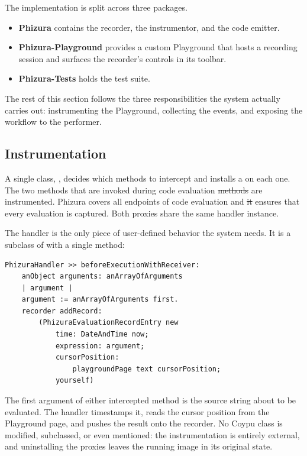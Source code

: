 \documentclass[
]{ceurart}
\providecommand{\DIFdel}[1]{{\protect\color{red}\sout{#1}}} %
\providecommand{\DIFdelbegin}{} %
\providecommand{\DIFdelend}{} %
\newcommand{\DIFscaledelfig}{0.5}
\newlength{\DIFdelgraphicswidth} %
\newlength{\DIFdelgraphicsheight} %
\newcommand{\DIFdelincludegraphics}[2][]{%
\sbox{\DIFdelgraphicsbox}{\DIFOincludegraphics[#1]{#2}}%
\settoboxwidth{\DIFdelgraphicswidth}{\DIFdelgraphicsbox} %
\settoboxtotalheight{\DIFdelgraphicsheight}{\DIFdelgraphicsbox} %
\scalebox{\DIFscaledelfig}{%
\parbox[b]{\DIFdelgraphicswidth}{\usebox{\DIFdelgraphicsbox}\\[-\baselineskip] \rule{\DIFdelgraphicswidth}{0em}}\llap{\resizebox{\DIFdelgraphicswidth}{\DIFdelgraphicsheight}{%
\setlength{\unitlength}{\DIFdelgraphicswidth}%
\begin{picture}(1,1)%
\thicklines\linethickness{2pt} %
{\color[rgb]{1,0,0}\put(0,0){\framebox(1,1){}}}%
{\color[rgb]{1,0,0}\put(0,0){\line( 1,1){1}}}%
{\color[rgb]{1,0,0}\put(0,1){\line(1,-1){1}}}%
\end{picture}%
}\hspace*{3pt}}} %
} %
\DeclareRobustCommand{\DIFdelbegin}{\DIFOdelbegin \let\includegraphics\DIFdelincludegraphics} %
\DeclareRobustCommand{\DIFdelend}{\DIFOaddend \let\includegraphics\DIFOincludegraphics} %
\begin{document}
The implementation is split across three packages.

\begin{itemize}
\item \textbf{Phizura} contains the recorder, the instrumentor, and the code emitter.
\item \textbf{Phizura-Playground} provides a custom Playground that hosts a recording session and surfaces the recorder's controls in its toolbar.
\item \textbf{Phizura-Tests} holds the test suite.
\end{itemize}

The rest of this section follows the three responsibilities the system actually carries out: instrumenting the Playground, collecting the events, and exposing the workflow to the performer.

\subsection{Instrumentation}

A single class, , decides which methods to intercept and installs a  on each one.
The two methods that are invoked during code evaluation \DIFdelbegin \DIFdel{methods }\DIFdelend are instrumented.
Phizura covers all endpoints of code evaluation and \DIFdelbegin \DIFdel{it }\DIFdelend ensures that every evaluation is captured.
Both proxies share the same handler instance.

The handler is the only piece of user-defined behavior the system needs.
It is a subclass of  with a single method:

\begin{lstlisting}[label={lst:handler-before},caption={PhizuraHandler before-execution hook}]
PhizuraHandler >> beforeExecutionWithReceiver:
    anObject arguments: anArrayOfArguments
    | argument |
    argument := anArrayOfArguments first.
    recorder addRecord:
        (PhizuraEvaluationRecordEntry new
            time: DateAndTime now;
            expression: argument;
            cursorPosition:
                playgroundPage text cursorPosition;
            yourself)
\end{lstlisting}

The first argument of either intercepted method is the source string about to be evaluated.
The handler timestamps it, reads the cursor position from the Playground page, and pushes the result onto the recorder.
No Coypu class is modified, subclassed, or even mentioned: the instrumentation is entirely external, and uninstalling the proxies leaves the running image in its original state.
\end{document}

